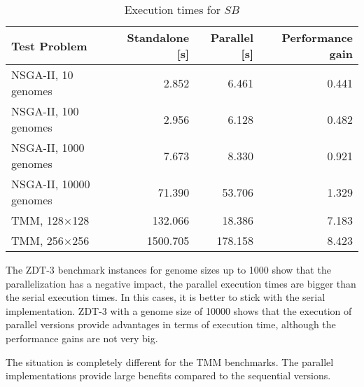 \begin{table}
  \centering
  \caption[Execution times for standalone sequential implementations]{Execution times for $SB$}
  \begin{tabular}{lrrr}\toprule[2pt]
    Test Problem &  Standalone [s] & Parallel [s] & Performance gain \\ \midrule
    NSGA-II, 10 genomes & 2.852 & 6.461 & 0.441 \\
    NSGA-II, 100 genomes & 2.956 & 6.128 & 0.482 \\
    NSGA-II, 1000 genomes & 7.673 & 8.330 & 0.921 \\
    NSGA-II, 10000 genomes & 71.390 & 53.706 & 1.329 \\
    TMM, 128$\times$128 & 132.066 & 18.386 & 7.183 \\
    TMM, 256$\times$256 & 1500.705 & 178.158 & 8.423 \\ \bottomrule[2pt]
  \end{tabular}
  \label{table:sequential-runtimes}
\end{table}

The ZDT-3 benchmark instances for genome sizes up to 1000 show that the parallelization has a negative impact, the parallel execution times are bigger than the serial execution times. In this cases, it is better to stick with the serial implementation. ZDT-3 with a genome size of 10000 shows that the execution of parallel versions provide advantages in terms of execution time, although the performance gains are not very big.

The situation is completely different for the TMM benchmarks. The parallel implementations provide large benefits compared to the sequential versions.